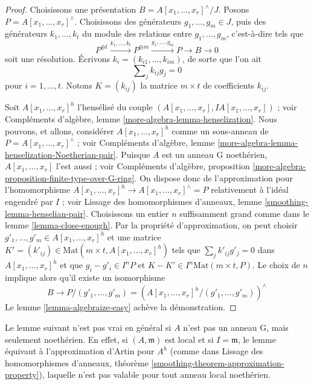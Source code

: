 \begin{proof}
Choisissons une présentation $B = A[x_1, \ldots, x_r]^\wedge/J$. Posons
$P = A[x_1, \ldots, x_r]^\wedge$. Choisissons des générateurs
$g_1, \ldots, g_m \in J$, puis des générateurs $k_1, \ldots, k_t$ du module
des relations entre $g_1, \ldots, g_m$, c'est-à-dire tels que
$$
P^{\oplus t} \xrightarrow{k_1, \ldots, k_t}
P^{\oplus m} \xrightarrow{g_1, \ldots, g_m}
P \to B \to 0
$$
soit une résolution. Écrivons $k_i = (k_{i1}, \ldots, k_{im})$, de sorte que
l'on ait
\begin{equation}
\label{equation-relations-straight-up}
\sum\nolimits_j k_{ij}g_j = 0
\end{equation}
pour $i = 1, \ldots, t$. Notons $K = (k_{ij})$ la matrice $m \times t$ de
coefficients $k_{ij}$.

\medskip\noindent
Soit $A[x_1, \ldots, x_r]^h$ l'hensélisé du couple
$(A[x_1, \ldots, x_r], IA[x_1, \ldots, x_r])$ ; voir Compléments d'algèbre,
lemme \ref{more-algebra-lemma-henselization}. Nous pouvons, et allons,
considérer $A[x_1, \ldots, x_r]^h$ comme un sous-anneau de
$P = A[x_1, \ldots, x_r]^\wedge$ ; voir Compléments d'algèbre, lemme
\ref{more-algebra-lemma-henselization-Noetherian-pair}. Puisque $A$ est un
anneau G noethérien, $A[x_1, \ldots, x_r]$ l'est aussi ; voir Compléments
d'algèbre, proposition
\ref{more-algebra-proposition-finite-type-over-G-ring}. On dispose donc de
l'approximation pour l'homomorphisme
$A[x_1, \ldots, x_r]^h \to A[x_1, \ldots, x_r]^\wedge = P$
relativement à l'idéal engendré par $I$ ; voir Lissage des homomorphismes
d'anneaux, lemme \ref{smoothing-lemma-henselian-pair}. Choisissons un entier
$n$ suffisamment grand comme dans le lemme \ref{lemma-close-enough}. Par la
propriété d'approximation, on peut choisir
$g'_1, \ldots, g'_m \in A[x_1, \ldots, x_r]^h$
et une matrice
$K' = (k'_{ij}) \in \text{Mat}(m \times t, A[x_1, \ldots, x_r]^h)$
tels que $\sum\nolimits_j k'_{ij}g'_j = 0$ dans
$A[x_1, \ldots, x_r]^h$ et que $g_i - g'_i \in I^nP$ et
$K - K' \in I^n\text{Mat}(m \times t, P)$. Le choix de $n$ implique alors
qu'il existe un isomorphisme
$$
B \to P/(g'_1, \ldots, g'_m) =
\left(A[x_1, \ldots, x_r]^h/(g'_1, \ldots, g'_m)\right)^\wedge
$$
Le lemme \ref{lemma-algebraize-easy} achève la démonstration.
\end{proof}

\noindent
Le lemme suivant n'est pas vrai en général si $A$ n'est pas un anneau G, mais
seulement noethérien. En effet, si $(A, \mathfrak m)$ est local et si
$I = \mathfrak m$, le lemme équivaut à l'approximation d'Artin pour $A^h$
(comme dans Lissage des homomorphismes d'anneaux, théorème
\ref{smoothing-theorem-approximation-property}), laquelle n'est pas valable
pour tout anneau local noethérien.

